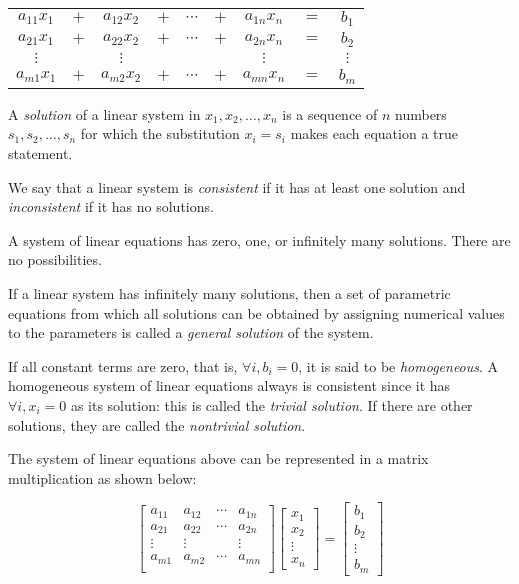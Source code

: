 \documentclass{report}
\begin{document}
		\begin{center}
			\begin{tabular}{ccccccccc}
				$a_{11}x_1$ & $+$ & $a_{12}x_2$ & $+$ & $\cdots$ & $+$ & $a_{1n}x_n$ & $=$ & $b_1$    \\
				$a_{21}x_1$ & $+$ & $a_{22}x_2$ & $+$ & $\cdots$ & $+$ & $a_{2n}x_n$ & $=$ & $b_2$    \\
				$\vdots$    &     & $\vdots$   &     &          &     & $\vdots$    &     & $\vdots$ \\
				$a_{m1}x_1$ & $+$ & $a_{m2}x_2$ & $+$ & $\cdots$ & $+$ & $a_{mn}x_n$ & $=$ & $b_m$   
			\end{tabular}
		\end{center}
		
		A \emph{solution} of a linear system in $x_1,x_2,\dots,x_n$ is a sequence of $n$ numbers $s_1,s_2,\dots,s_n$ for which the substitution $x_i=s_i$ makes each equation a true statement.
		
		We say that a linear system is \emph{consistent} if it has at least one solution and \emph{inconsistent} if it has no solutions.
		
		\begin{thm}
			A system of linear equations has zero, one, or infinitely many solutions. There are no possibilities.
		\end{thm}
		
		If a linear system has infinitely many solutions, then a set of parametric equations from which all solutions can be obtained by assigning numerical values to the parameters is called a \emph{general solution} of the system.
		
		If all constant terms are zero, that is, $\forall i, b_i=0$, it is said to be \emph{homogeneous}. A homogeneous system of linear equations always is consistent since it has $\forall i, x_i=0$ as its solution: this is called the \emph{trivial solution}. If there are other solutions, they are called the \emph{nontrivial solution}.
		
		The system of linear equations above can be represented in a matrix multiplication as shown below:
		
		\begin{displaymath}
			\begin{bmatrix}
				a_{11} & a_{12} & \cdots & a_{1n} \\
				a_{21} & a_{22} & \cdots & a_{2n} \\
				\vdots & \vdots &        & \vdots \\
				a_{m1} & a_{m2} & \cdots & a_{mn} \\
			\end{bmatrix}
			\begin{bmatrix}
				x_1 \\ x_2 \\ \vdots \\ x_n
			\end{bmatrix}
			=
			\begin{bmatrix}
				b_1 \\ b_2 \\ \vdots \\ b_m
			\end{bmatrix}
		\end{displaymath}
		
\end{document}
